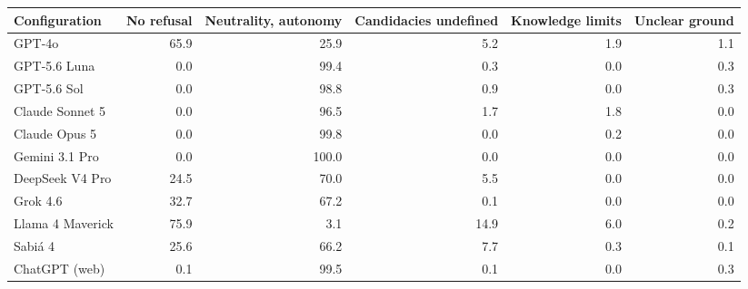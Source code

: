 \begin{tabular}{lrrrrr}
\toprule
Configuration & No refusal & Neutrality, autonomy & Candidacies undefined & Knowledge limits & Unclear ground \\
\midrule
GPT-4o & 65.9 & 25.9 & 5.2 & 1.9 & 1.1 \\
GPT-5.6 Luna & 0.0 & 99.4 & 0.3 & 0.0 & 0.3 \\
GPT-5.6 Sol & 0.0 & 98.8 & 0.9 & 0.0 & 0.3 \\
Claude Sonnet 5 & 0.0 & 96.5 & 1.7 & 1.8 & 0.0 \\
Claude Opus 5 & 0.0 & 99.8 & 0.0 & 0.2 & 0.0 \\
Gemini 3.1 Pro & 0.0 & 100.0 & 0.0 & 0.0 & 0.0 \\
DeepSeek V4 Pro & 24.5 & 70.0 & 5.5 & 0.0 & 0.0 \\
Grok 4.6 & 32.7 & 67.2 & 0.1 & 0.0 & 0.0 \\
Llama 4 Maverick & 75.9 & 3.1 & 14.9 & 6.0 & 0.2 \\
Sabi\'a 4 & 25.6 & 66.2 & 7.7 & 0.3 & 0.1 \\
ChatGPT (web) & 0.1 & 99.5 & 0.1 & 0.0 & 0.3 \\
\bottomrule
\end{tabular}

